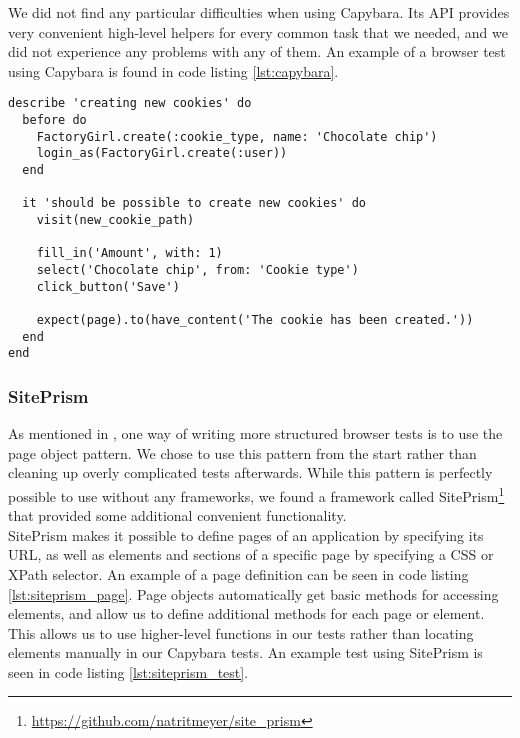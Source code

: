 We did not find any particular difficulties when using Capybara. Its API
provides very convenient high-level helpers for every common task that
we needed, and we did not experience any problems with any of them. An
example of a browser test using Capybara is found in code listing
\ref{lst:capybara}.\\


\begin{lstlisting}[caption=A browser test written in RSpec using Capybara.,
                   label=lst:capybara, float=t]
describe 'creating new cookies' do
  before do
    FactoryGirl.create(:cookie_type, name: 'Chocolate chip')
    login_as(FactoryGirl.create(:user))
  end

  it 'should be possible to create new cookies' do
    visit(new_cookie_path)

    fill_in('Amount', with: 1)
    select('Chocolate chip', from: 'Cookie type')
    click_button('Save')

    expect(page).to(have_content('The cookie has been created.'))
  end
end
\end{lstlisting}


\subsubsection{SitePrism}

As mentioned in , one way of writing more
structured browser tests is to use the page object pattern. We chose to
use this pattern from the start rather than cleaning up overly
complicated tests afterwards. While this pattern is perfectly possible
to use without any frameworks, we found a framework called
SitePrism\footnote{\url{https://github.com/natritmeyer/site_prism}}
that provided some additional convenient functionality.\\

SitePrism makes it possible to define pages of an application by
specifying its URL, as well as elements and sections of a specific page
by specifying a CSS or XPath selector. An example of a page definition
can be seen in code listing \ref{lst:siteprism_page}. Page objects
automatically get basic methods for accessing elements, and allow us to
define additional methods for each page or element. This allows us to
use higher-level functions in our tests rather than locating elements
manually in our Capybara tests. An example test using SitePrism is seen
in code listing \ref{lst:siteprism_test}.\\

